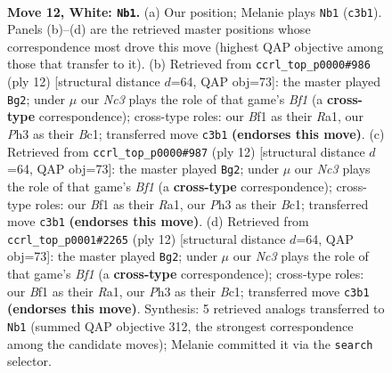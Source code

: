 \documentclass[11pt]{article}
\begin{document}
\clearpage

\begin{figure}[p]\centering
\begin{subfigure}{0.46\textwidth}\centering
\resizebox{\linewidth}{!}{%
\newchessgame
\chessboard[
  setfen={rnb1k2r/4bp2/1q2pnp1/p2p3p/3P3N/2N4P/PP3PP1/R1BQKBR1 w Qkq - 0 12},
  showmover=false,
  pgfstyle=straightmove, color=movearrow, markmove={c3-b1}
]}
\caption{}
\end{subfigure}\hfill
\begin{subfigure}{0.46\textwidth}\centering
\resizebox{\linewidth}{!}{%
\newchessgame
\chessboard[
  setfen={rn1qkbnr/1b1p1ppp/p3p3/1p6/3NP3/2N3P1/PPP2P1P/R1BQKB1R w KQkq - 1 7},
  showmover=false,
  pgfstyle=straightmove, color=movearrow, markmove={f1-g2}
]}
\caption{}
\end{subfigure}
\\[4pt]
\begin{subfigure}{0.46\textwidth}\centering
\resizebox{\linewidth}{!}{%
\newchessgame
\chessboard[
  setfen={rn1qkbnr/1b1p1ppp/p3p3/1p6/3NP3/2N3P1/PPP2P1P/R1BQKB1R w KQkq - 1 7},
  showmover=false,
  pgfstyle=straightmove, color=movearrow, markmove={f1-g2}
]}
\caption{}
\end{subfigure}\hfill
\begin{subfigure}{0.46\textwidth}\centering
\resizebox{\linewidth}{!}{%
\newchessgame
\chessboard[
  setfen={rn1qkbnr/1b1p1ppp/p3p3/1p6/3NP3/2N3P1/PPP2P1P/R1BQKB1R w KQkq - 1 7},
  showmover=false,
  pgfstyle=straightmove, color=movearrow, markmove={f1-g2}
]}
\caption{}
\end{subfigure}
\caption{\textbf{Move 12, White: \texttt{Nb1}.} (a) Our position; Melanie plays \texttt{Nb1} (\texttt{c3b1}). Panels (b)--(d) are the retrieved master positions whose correspondence most drove this move (highest QAP objective among those that transfer to it). (b) Retrieved from \texttt{ccrl\_top\_p0000\#986} (ply 12) [structural distance $d$=64, QAP obj=73]: the master played \texttt{Bg2}; under $\mu$ our \emph{Nc3} plays the role of that game's \emph{Bf1} (a \textbf{cross-type} correspondence); cross-type roles: our \emph{B}f1 as their \emph{R}a1, our \emph{P}h3 as their \emph{B}c1; transferred move \texttt{c3b1} \textbf{(endorses this move)}. (c) Retrieved from \texttt{ccrl\_top\_p0000\#987} (ply 12) [structural distance $d$=64, QAP obj=73]: the master played \texttt{Bg2}; under $\mu$ our \emph{Nc3} plays the role of that game's \emph{Bf1} (a \textbf{cross-type} correspondence); cross-type roles: our \emph{B}f1 as their \emph{R}a1, our \emph{P}h3 as their \emph{B}c1; transferred move \texttt{c3b1} \textbf{(endorses this move)}. (d) Retrieved from \texttt{ccrl\_top\_p0001\#2265} (ply 12) [structural distance $d$=64, QAP obj=73]: the master played \texttt{Bg2}; under $\mu$ our \emph{Nc3} plays the role of that game's \emph{Bf1} (a \textbf{cross-type} correspondence); cross-type roles: our \emph{B}f1 as their \emph{R}a1, our \emph{P}h3 as their \emph{B}c1; transferred move \texttt{c3b1} \textbf{(endorses this move)}. Synthesis: 5 retrieved analogs transferred to \texttt{Nb1} (summed QAP objective 312, the strongest correspondence among the candidate moves); Melanie committed it via the \texttt{search} selector.}

\end{figure}
\end{document}
